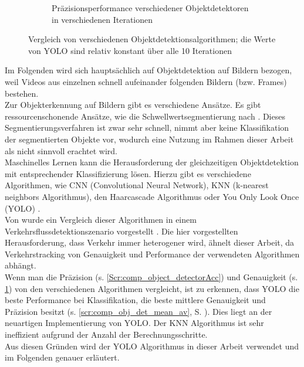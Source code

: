 \begin{figure}[ht]
\begin{subfigure}[b]{0.45\textwidth}
		\caption{Präzisionsperformance verschiedener Objektdetektoren in verschiedenen Iterationen  \cite{Pavani2022}}
		\label{Scr:comp_object_detectorPrec}
	\end{subfigure} 
	\caption[Vergleich von verschiedenen Objektdetektionsalgorithmen]{Vergleich von verschiedenen Objektdetektionsalgorithmen; die Werte von YOLO sind relativ konstant über alle 10 Iterationen \cite{Pavani2022}}
	\label{Scr:comp_object_detector}
\end{figure}
{Im Folgenden wird sich hauptsächlich auf Objektdetektion auf Bildern bezogen, weil Videos aus einzelnen schnell aufeinander folgenden Bildern (bzw. Frames) bestehen. \\
Zur Objekterkennung auf Bildern gibt es verschiedene Ansätze. Es gibt ressourcenschonende Ansätze, wie die Schwellwertsegmentierung nach \citeauthor{Otsu1979} \cite{Otsu1979}. Dieses Segmentierungsverfahren ist zwar sehr schnell, nimmt aber keine Klassifikation der segmentierten Objekte vor, wodurch eine Nutzung im Rahmen dieser Arbeit als nicht sinnvoll erachtet wird. \\
Maschinelles Lernen kann die Herausforderung der gleichzeitigen Objektdetektion mit entsprechender Klassifizierung lösen. Hierzu gibt es verschiedene Algorithmen, wie CNN (\glqq Convolutional Neural Network\grqq{}), KNN (\glqq k-nearest neighbors\grqq{} Algorithmus), den Haarcascade Algorithmus oder \glqq You Only Look Once\grqq{} (YOLO) 
\cite{Pavani2022}. \\
Von \citeauthor{Pavani2022} \cite{Pavani2022} wurde ein Vergleich dieser Algorithmen in einem  Verkehrsflussdetektionszenario vorgestellt \citep{Pavani2022}. Die hier vorgestellten Herausforderung, dass Verkehr immer heterogener wird, ähnelt dieser Arbeit, da Verkehrstracking von Genauigkeit und Performance der verwendeten Algorithmen abhängt.\\
Wenn man die Präzision (s. \ref{Scr:comp_object_detectorAcc}) und Genauigkeit (s. \ref{Scr:comp_object_detectorPrec}) von den verschiedenen Algorithmen vergleicht, ist zu erkennen, dass YOLO die beste Performance bei Klassifikation, die beste mittlere Genauigkeit und Präzision besitzt (s. \ref{scr:comp_obj_det_mean_av}, S. \pageref{scr:comp_obj_det_mean_av}). Dies liegt an der neuartigen Implementierung von YOLO. Der KNN Algorithmus ist sehr ineffizient aufgrund der Anzahl der Berechnungsschritte.\\
Aus diesen Gründen wird der YOLO Algorithmus in dieser Arbeit verwendet und im Folgenden genauer erläutert.

 }


